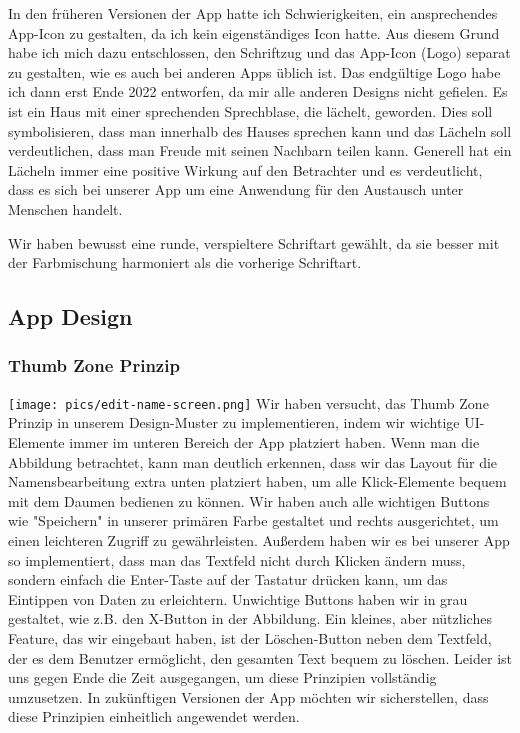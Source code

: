 In den früheren Versionen der App hatte ich Schwierigkeiten, ein ansprechendes App-Icon zu gestalten, da ich kein eigenständiges Icon hatte. Aus diesem Grund habe ich mich dazu entschlossen, den Schriftzug und das App-Icon (Logo) separat zu gestalten, wie es auch bei anderen Apps üblich ist. Das endgültige Logo habe ich dann erst Ende 2022 entworfen, da mir alle anderen Designs nicht gefielen. Es ist ein Haus mit einer sprechenden Sprechblase, die lächelt, geworden. Dies soll symbolisieren, dass man innerhalb des Hauses sprechen kann und das Lächeln soll verdeutlichen, dass man Freude mit seinen Nachbarn teilen kann. Generell hat ein Lächeln immer eine positive Wirkung auf den Betrachter und es verdeutlicht, dass es sich bei unserer App um eine Anwendung für den Austausch unter Menschen handelt.

Wir haben bewusst eine runde, verspieltere Schriftart gewählt, da sie besser mit der Farbmischung harmoniert als die vorherige Schriftart.
\subsection{App Design}
\subsubsection{Thumb Zone Prinzip}
\texttt{[image: pics/edit-name-screen.png]}
Wir haben versucht, das Thumb Zone Prinzip in unserem Design-Muster zu implementieren, indem wir wichtige UI-Elemente immer im unteren Bereich der App platziert haben. Wenn man die Abbildung betrachtet, kann man deutlich erkennen, dass wir das Layout für die Namensbearbeitung extra unten platziert haben, um alle Klick-Elemente bequem mit dem Daumen bedienen zu können. Wir haben auch alle wichtigen Buttons wie "Speichern" in unserer primären Farbe gestaltet und rechts ausgerichtet, um einen leichteren Zugriff zu gewährleisten. Außerdem haben wir es bei unserer App so implementiert, dass man das Textfeld nicht durch Klicken ändern muss, sondern einfach die Enter-Taste auf der Tastatur drücken kann, um das Eintippen von Daten zu erleichtern. Unwichtige Buttons haben wir in grau gestaltet, wie z.B. den X-Button in der Abbildung. Ein kleines, aber nützliches Feature, das wir eingebaut haben, ist der Löschen-Button neben dem Textfeld, der es dem Benutzer ermöglicht, den gesamten Text bequem zu löschen. Leider ist uns gegen Ende die Zeit ausgegangen, um diese Prinzipien vollständig umzusetzen. In zukünftigen Versionen der App möchten wir sicherstellen, dass diese Prinzipien einheitlich angewendet werden.
